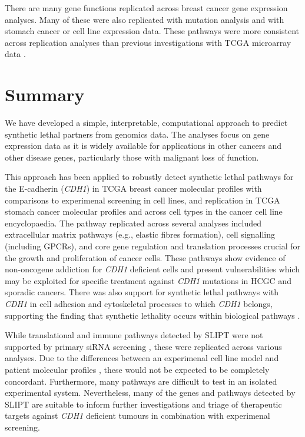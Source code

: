 There are many gene functions replicated across breast cancer gene expression analyses. Many of these were also replicated with mutation analysis and with stomach cancer or cell line expression data. These pathways were more consistent across replication analyses than previous investigations with TCGA microarray data \cite{Kelly2013}.   

\section{Summary}

We have developed a simple, interpretable, computational approach to predict synthetic lethal partners from genomics data. The analyses focus on gene expression data as it is widely available for applications in other cancers and other disease genes, particularly those with malignant loss of function.

This approach has been applied to robustly detect synthetic lethal pathways for the E-cadherin (\textit{CDH1}) in TCGA breast cancer molecular profiles with comparisons to experimenal screening \citep{Telford2015} in cell lines, and replication in TCGA stomach cancer molecular profiles and across cell types in the cancer cell line encyclopaedia. The pathway replicated across several analyses included extracellular matrix pathways (e.g., elastic fibres formation), cell signalling (including GPCRs), and core gene regulation and translation processes crucial for the growth and proliferation of cancer cells. These pathways show evidence of non-oncogene addiction for \textit{CDH1} deficient cells and present vulnerabilities which may be exploited for specific treatment against \textit{CDH1} mutations in HCGC and sporadic cancers. There was also support for synthetic lethal pathways with \textit{CDH1} in cell adhesion and cytoskeletal processes to which \textit{CDH1} belongs, supporting the finding that synthetic lethality occurs within biological pathways \citep{Kelley2005, Boone2007}.

While translational and immune pathways detected by \gls{SLIPT} were not supported by primary siRNA screening \citep{Telford2015}, these were replicated across various analyses. Due to the differences between an experimenal cell line model \citep{Barretina2012, Chen2014, Fece2015} and patient molecular profiles \citep{TCGA2012, TCGA2014GC}, these would not be expected to be completely concordant. Furthermore, many pathways are difficult to test in an isolated experimental system. Nevertheless, many of the genes and pathways detected by \gls{SLIPT} are suitable to inform further investigations and triage of therapeutic targets against \textit{CDH1} deficient tumours in combination with experimenal screening.  

